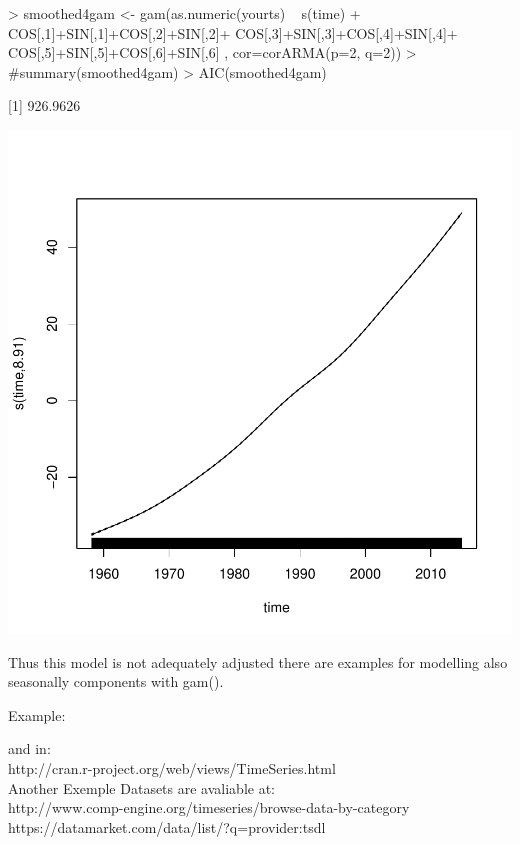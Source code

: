\documentclass[11pt, a4paper]{article} %
\begin{document}
\begin{Schunk}
\begin{Sinput}
> smoothed4gam <- gam(as.numeric(yourts) ~ s(time)  +
                         COS[,1]+SIN[,1]+COS[,2]+SIN[,2]+
                         COS[,3]+SIN[,3]+COS[,4]+SIN[,4]+
                         COS[,5]+SIN[,5]+COS[,6]+SIN[,6]
                       , cor=corARMA(p=2, q=2))
> #summary(smoothed4gam)
> AIC(smoothed4gam)
\end{Sinput}
[1] 926.9626\end{Schunk}

\begin{Schunk}
\end{Schunk}
\includegraphics{alleselena-069}

Thus this model is not adequately adjusted there are examples for modelling also seasonally components with gam(). 

Example: 


and in:\\
http://cran.r-project.org/web/views/TimeSeries.html\\
Another Exemple Datasets are avaliable at:\\
http://www.comp-engine.org/timeseries/browse-data-by-category\\
https://datamarket.com/data/list/?q=provider:tsdl\\
\end{document}
